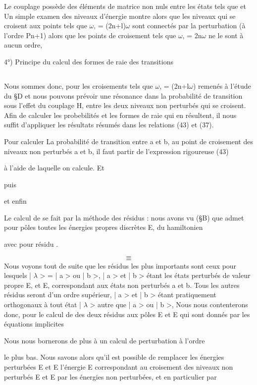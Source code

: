 Le couplage  possède des éléments de matrice non nuls
entre les états tels que  et Un simple examen des niveaux
d'énergie montre alors que les niveaux qui se croisent aux points tels que
$\omega$, = (2n+l)$\omega$ sont connectés par la perturbation (à l'ordre Pn+1) alors que
les points de croisement tels que $\omega$, = 2n$\omega$ ne le sont à aucun ordre,

4°) Principe du calcul des formes de raie des transitions
\subsection{}%
Nous sommes donc, pour les croisements tels que $\omega$, = (2n+l$\omega$)
remenés à l'étude du \S D et nous pouvons prévoir une résonance dans la probabilité
de transition sous l'effet du couplage H, entre les deux niveaux non
perturbés qui se croisent. Afin de calculer les probebilités et les formes de
raie qui en résultent, il nous suffit d'appliquer les résultats résumés dans
les relations (43) et (37).

Pour calculer La probabilité de transition entre a et b, au point de croisement
des niveaux non perturbés a et b, il faut partir de l'expression rigoureuse (43)

à l'aide de laquelle on calcule. Et

puis

et enfin

Le calcul de  se fait par la méthode des résidus : nous avons vu (\S B) que
 admet pour pôles toutes les énergies propres discrètes E, du hamiltonien

 avec pour résidu .


\[
\tag{51}=
\]
\[
\tag{52}=
\]
Nous voyons tout de suite que les résidus les plus importants sont ceux pour
lesquels | $\lambda$ > = | a > ou | b >, | a > et | b > étant les états perturbés de
valeur propre E, et E, correspondant aux états non perturbés a et b. Tous
les autres résidus seront d'un ordre supérieur, | a > et | b > étant pratiquement
orthogonaux à tout état | $\lambda$ > autre que | a > ou | b >, Nous nous contenterons donc,
pour le calcul de  des deux résidus aux pôles E et E
qui sont donnés par les équations implicites

Nous nous bornerons de plus à un calcul de perturbation à l'ordre

le plus bas. Nous savons alors qu'il est possible de remplacer les énergies
perturbées E et E
l'énergie E correspondant au croisement des niveaux non perturbés E et E
par les énergies non perturbées, et en particulier par

